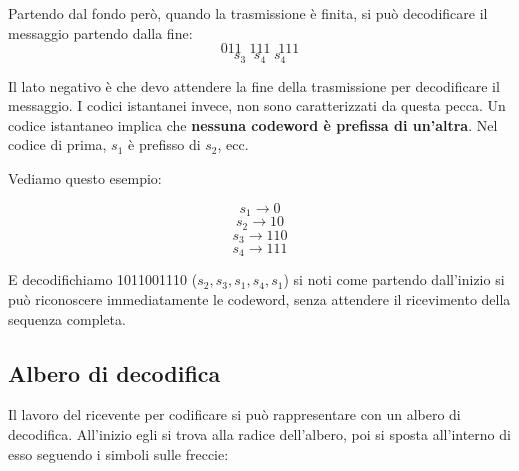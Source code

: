 Partendo dal fondo però, quando la trasmissione è finita, si può decodificare il messaggio partendo dalla fine:
\begin{equation*}
011 \; \; 111 \; \; 111
\end{equation*}
\begin{equation*}
s_3 \; \; s_4 \; \; s_4
\end{equation*}

Il lato negativo è che devo attendere la fine della trasmissione per decodificare il messaggio.
I codici istantanei invece, non sono caratterizzati da questa pecca.
Un codice istantaneo implica che \textbf{nessuna codeword è prefissa di un'altra}.
Nel codice di prima, $s_1$ è prefisso di $s_2$, ecc.

\newpage
Vediamo questo esempio:

\begin{equation*}
s_1 \rightarrow 0
\end{equation*}
\begin{equation*}
s_2 \rightarrow 10
\end{equation*}
\begin{equation*}
s_3 \rightarrow 110
\end{equation*}
\begin{equation*}
s_4 \rightarrow 111
\end{equation*}

E decodifichiamo 1011001110 ($s_2, s_3, s_1, s_4, s_1$) si noti come partendo dall'inizio si può riconoscere immediatamente le codeword, senza attendere il ricevimento della sequenza completa.

\subsection*{Albero di decodifica}

Il lavoro del ricevente per codificare si può rappresentare con un albero di decodifica.
All'inizio egli si trova alla radice dell'albero, poi si sposta all'interno di esso seguendo i simboli sulle freccie:


